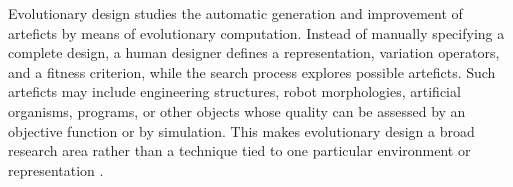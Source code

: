



Evolutionary design studies the automatic generation and improvement of arteficts by means of evolutionary computation. Instead of manually specifying a complete design, a human designer defines a representation, variation operators, and a fitness criterion, while the search process explores possible arteficts. Such arteficts may include engineering structures, robot morphologies, artificial organisms, programs, or other objects whose quality can be assessed by an objective function or by simulation. This makes evolutionary design a broad research area rather than a technique tied to one particular environment or representation \cite{bentley1999introduction}.

